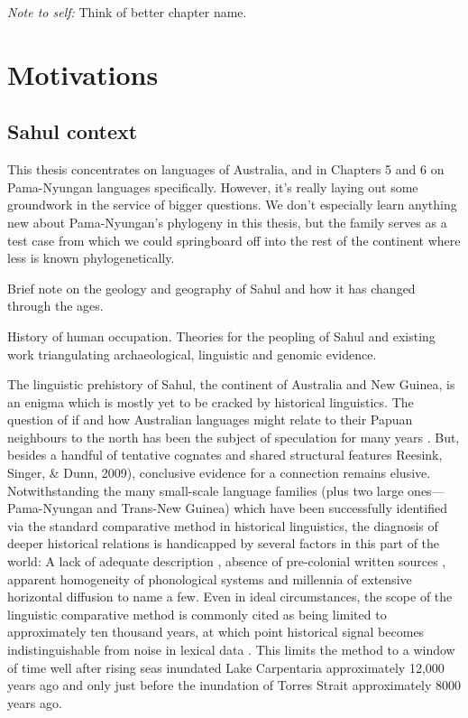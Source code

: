 \emph{Note to self:} Think of better chapter name.

\hypertarget{motivations}{%
\section{Motivations}\label{motivations}}

\hypertarget{sahul-context}{%
\subsection{Sahul context}\label{sahul-context}}

This thesis concentrates on languages of Australia, and in Chapters 5 and 6 on Pama-Nyungan languages specifically. However, it's really laying out some groundwork in the service of bigger questions. We don't especially learn anything new about Pama-Nyungan's phylogeny in this thesis, but the family serves as a test case from which we could springboard off into the rest of the continent where less is known phylogenetically.

Brief note on the geology and geography of Sahul and how it has changed through the ages.

History of human occupation. Theories for the peopling of Sahul and existing work triangulating archaeological, linguistic and genomic evidence.

The linguistic prehistory of Sahul, the continent of Australia and New Guinea, is an enigma which is mostly yet to be cracked by historical linguistics. The question of if and how Australian languages might relate to their Papuan neighbours to the north has been the subject of speculation for many years \autocites[e.g.][]{ogrady_languages_1966}{wurm_papuan_1975}. But, besides a handful of tentative cognates \autocite{foley_papuan_1986} and shared structural features \autocite{nichols_sprung_1997} Reesink, Singer, \& Dunn, 2009), conclusive evidence for a connection remains elusive. Notwithstanding the many small-scale language families (plus two large ones---Pama-Nyungan and Trans-New Guinea) which have been successfully identified via the standard comparative method in historical linguistics, the diagnosis of deeper historical relations is handicapped by several factors in this part of the world: A lack of adequate description \autocite{bowern_computational_2012}, absence of pre-colonial written sources \autocite{foley_papuan_1986}, apparent homogeneity of phonological systems \autocite{baker_word_2014} and millennia of extensive horizontal diffusion \autocites{foley_papuan_1986}{dixon_australian_2002} to name a few. Even in ideal circumstances, the scope of the linguistic comparative method is commonly cited as being limited to approximately ten thousand years, at which point historical signal becomes indistinguishable from noise in lexical data \autocite{nichols_sprung_1997}. This limits the method to a window of time well after rising seas inundated Lake Carpentaria approximately 12,000 years ago and only just before the inundation of Torres Strait approximately 8000 years ago.

